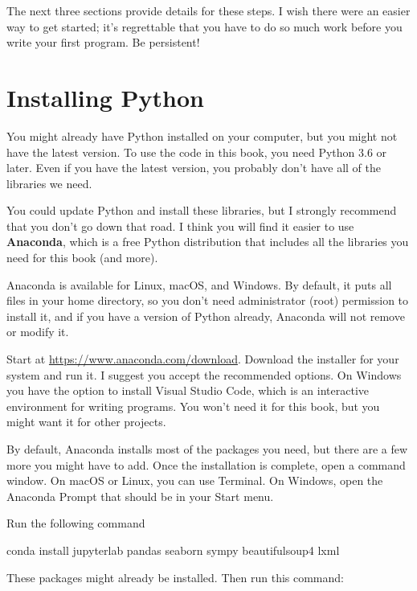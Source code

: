 \documentclass[12pt]{book}
\theoremstyle{exercise}
\begin{document}
The next three sections provide details for these steps.  I wish there were an easier way to get started; it's regrettable that you have to do so much work before you write your first program.  Be persistent!


\section*{Installing Python}

You might already have Python installed on your computer, but you might not have the latest version.  To use the code in this book, you need Python 3.6 or later.  Even if you have the latest version, you probably don't have all of the libraries we need.


You could update Python and install these libraries, but I strongly recommend that you don't go down that road.  I think you will find it easier to use {\bf Anaconda}, which is a free Python distribution that includes all the libraries you need for this book (and more).


Anaconda is available for Linux, macOS, and Windows.  By default, it puts all files in your home directory, so you don't need administrator (root) permission to install it, and if you have a version of Python already, Anaconda will not remove or modify it.

Start at \url{https://www.anaconda.com/download}.  Download the installer for your system and run it.  I suggest you accept the recommended options.
On Windows you have the option to install Visual Studio Code, which is an interactive environment for writing programs.  You won't need it for this book, but you might want it for other projects.

By default, Anaconda installs most of the packages you need, but there are a few more you might have to add.  Once the installation is complete, open a command window.  On macOS or Linux, you can use Terminal.  On Windows, open the Anaconda Prompt that should be in your Start menu.

Run the following command

\begin{code}
conda install jupyterlab pandas seaborn sympy beautifulsoup4 lxml
\end{code}

These packages might already be installed.  Then run this command:
\end{document}
